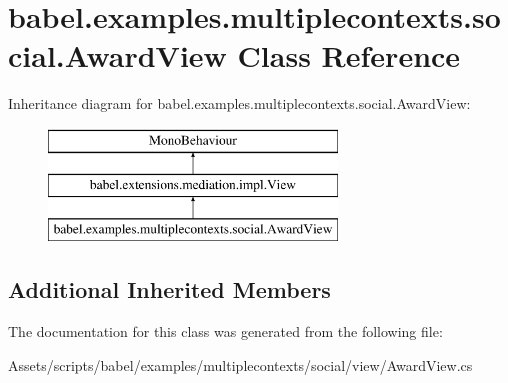 \hypertarget{classbabel_1_1examples_1_1multiplecontexts_1_1social_1_1_award_view}{\section{babel.\-examples.\-multiplecontexts.\-social.\-Award\-View Class Reference}
\label{classbabel_1_1examples_1_1multiplecontexts_1_1social_1_1_award_view}
}
Inheritance diagram for babel.\-examples.\-multiplecontexts.\-social.\-Award\-View\-:\begin{figure}[H]
\begin{center}
\leavevmode
\includegraphics[height=3.000000cm]{classbabel_1_1examples_1_1multiplecontexts_1_1social_1_1_award_view}
\end{center}
\end{figure}
\subsection*{Additional Inherited Members}


The documentation for this class was generated from the following file\-:\begin{DoxyCompactItemize}
\item 
Assets/scripts/babel/examples/multiplecontexts/social/view/Award\-View.\-cs\end{DoxyCompactItemize}
